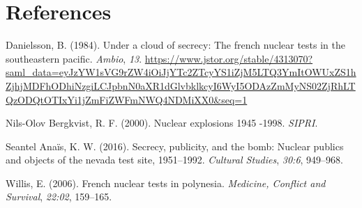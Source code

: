 \documentclass[
  12pt,
]{article}
\newlength{\cslhangindent}
\newlength{\cslentryspacingunit} %
\newenvironment{CSLReferences}[2] %
 {%
  \setlength{\parindent}{0pt}
  \ifodd #1
  \let\oldpar\par
  \def\par{\hangindent=\cslhangindent\oldpar}
  \fi
  \setlength{\parskip}{#2\cslentryspacingunit}
 }%
 {}
\begin{document}
\newpage

\hypertarget{references}{%
\section{References}\label{references}}

\hypertarget{refs}{}
\begin{CSLReferences}{1}{0}
\leavevmode{}%
Danielsson, B. (1984). Under a cloud of secrecy: The french nuclear tests in the southeastern pacific. \emph{Ambio}, \emph{13}. \url{https://www.jstor.org/stable/4313070?saml_data=eyJzYW1sVG9rZW4iOiJjYTc2ZTcyYS1iZjM5LTQ3YmItOWUxZS1hZjhjMDFhODhiNzgiLCJpbnN0aXR1dGlvbklkcyI6WyI5ODAzZmMyNS02ZjRhLTQzODQtOTIxYi1jZmFiZWFmNWQ4NDMiXX0\&seq=1}

\leavevmode{}%
Nils-Olov Bergkvist, R. F. (2000). Nuclear explosions 1945 -1998. \emph{SIPRI}.

\leavevmode{}%
Seantel Anaïs, K. W. (2016). Secrecy, publicity, and the bomb: Nuclear publics and objects of the nevada test site, 1951--1992. \emph{Cultural Studies}, \emph{30:6}, 949--968.

\leavevmode{}%
Willis, E. (2006). French nuclear tests in polynesia. \emph{Medicine, Conflict and Survival}, \emph{22:02}, 159--165.

\end{CSLReferences}
\end{document}
